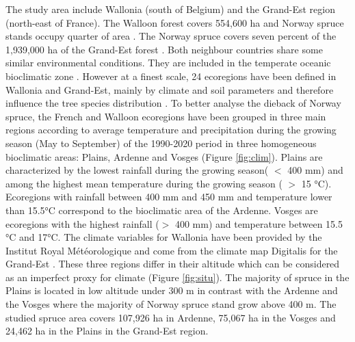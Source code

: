 \documentclass[3p,procedia]{elsarticle}
\begin{document}
The study area include Wallonia (south of Belgium) and the Grand-Est region (north-east of France).
The Walloon forest covers 554,600 ha and  Norway spruce stands occupy quarter of area \citep{lejeune_ep_2022}.  
The Norway spruce covers seven percent of the 1,939,000 ha of the Grand-Est forest \citep{IGN2022}. 
Both neighbour countries share some similar environmental conditions.
They are included in the temperate oceanic bioclimatic zone \citep{lindner_climate_2010}.
However at a finest scale, 24 ecoregions have been defined in  Wallonia and Grand-Est, mainly by climate and soil parameters and therefore influence the tree species distribution \citep{walthert_tree_2017}.
To better analyse the dieback of Norway spruce, the French and Walloon ecoregions have been grouped in three main regions according to average temperature and precipitation during the growing season (May to September) of the 1990-2020 period in three homogeneous bioclimatic areas: Plains, Ardenne and Vosges (Figure \ref{fig:clim}).
Plains are characterized by the lowest rainfall during the growing season( $<$ 400 mm) and among the highest mean temperature during the growing season ( $>$ 15 °C).
Ecoregions with rainfall between 400 mm and 450 mm and temperature lower than 15.5°C correspond to the bioclimatic area of the Ardenne.
Vosges are ecoregions with the highest rainfall ($>$ 400 mm) and temperature between 15.5 °C and 17°C.
The climate variables for Wallonia have been provided by the Institut Royal Météorologique and come from the climate map Digitalis for the Grand-Est \citep{piedallu_presentation_2014}.
These three regions differ in their altitude which can be considered as an imperfect proxy for climate (Figure \ref{fig:situ}). 
The majority of spruce in the Plains is located in low altitude under 300 m in contrast with the Ardenne and the Vosges where the majority of Norway spruce stand grow above 400 m. 
The studied spruce area covers 107,926 ha in Ardenne, 75,067 ha in the Vosges and  24,462 ha in the Plains in the Grand-Est region.
\end{document}

